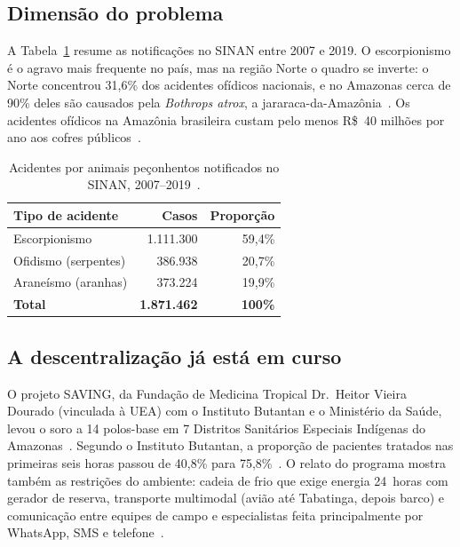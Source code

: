 \documentclass[a4paper,12pt]{article}
\begin{document}
\subsection{Dimensão do problema}

A Tabela~\ref{tab:sinan} resume as notificações no SINAN entre 2007 e 2019.
O escorpionismo é o agravo mais frequente no país, mas na região Norte o
quadro se inverte: o Norte concentrou 31,6\% dos acidentes ofídicos
nacionais, e no Amazonas cerca de 90\% deles são causados pela
\emph{Bothrops atrox}, a jararaca-da-Amazônia~\cite{diversitas2022}. Os
acidentes ofídicos na Amazônia brasileira custam pelo menos R\$~40 milhões
por ano aos cofres públicos~\cite{butantan40mi}.

\begin{table}[H]
  \centering
  \caption{Acidentes por animais peçonhentos notificados no SINAN, 2007--2019~\cite{completude2023}.}
  \label{tab:sinan}
  \begin{tabular}{lrr}
    \toprule
    \textbf{Tipo de acidente} & \textbf{Casos} & \textbf{Proporção} \\
    \midrule
    Escorpionismo        & 1.111.300 & 59,4\% \\
    Ofidismo (serpentes) &   386.938 & 20,7\% \\
    Araneísmo (aranhas)  &   373.224 & 19,9\% \\
    \midrule
    \textbf{Total}       & \textbf{1.871.462} & \textbf{100\%} \\
    \bottomrule
  \end{tabular}
\end{table}

\subsection{A descentralização já está em curso}

O projeto SAVING, da Fundação de Medicina Tropical Dr.~Heitor Vieira Dourado
(vinculada à UEA) com o Instituto Butantan e o Ministério da Saúde, levou o
soro a 14 polos-base em 7 Distritos Sanitários Especiais Indígenas do
Amazonas~\cite{farias2025}. Segundo o Instituto Butantan, a proporção de
pacientes tratados nas primeiras seis horas passou de 40,8\% para
75,8\%~\cite{butantan40mi}. O relato do programa mostra também as
restrições do ambiente: cadeia de frio que exige energia 24~horas com
gerador de reserva, transporte multimodal (avião até Tabatinga, depois barco)
e comunicação entre equipes de campo e especialistas feita principalmente
por WhatsApp, SMS e telefone~\cite{farias2025}.
\end{document}
